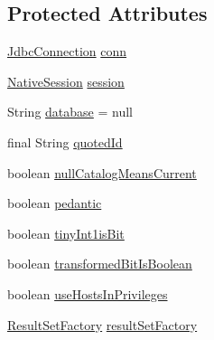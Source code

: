 \subsection*{Protected Attributes}
\begin{DoxyCompactItemize}
\item 
\mbox{\hyperlink{interfacecom_1_1mysql_1_1cj_1_1jdbc_1_1_jdbc_connection}{Jdbc\+Connection}} \mbox{\hyperlink{classcom_1_1mysql_1_1cj_1_1jdbc_1_1_database_meta_data_a29fa803adee5657c2bc4ecc79237ee5d}{conn}}
\item 
\mbox{\hyperlink{classcom_1_1mysql_1_1cj_1_1_native_session}{Native\+Session}} \mbox{\hyperlink{classcom_1_1mysql_1_1cj_1_1jdbc_1_1_database_meta_data_a10c93331f3bb1edfe4951c37ecffad95}{session}}
\item 
String \mbox{\hyperlink{classcom_1_1mysql_1_1cj_1_1jdbc_1_1_database_meta_data_a789acbb5308c9c0df47576c2d3c608f3}{database}} = null
\item 
final String \mbox{\hyperlink{classcom_1_1mysql_1_1cj_1_1jdbc_1_1_database_meta_data_abed2089ad23244c8fc1f4b4b2eb4b7d9}{quoted\+Id}}
\item 
boolean \mbox{\hyperlink{classcom_1_1mysql_1_1cj_1_1jdbc_1_1_database_meta_data_a4725e50078ee6414b6f2e78692e3109d}{null\+Catalog\+Means\+Current}}
\item 
boolean \mbox{\hyperlink{classcom_1_1mysql_1_1cj_1_1jdbc_1_1_database_meta_data_a959661937f63147361e0e2851ae843c9}{pedantic}}
\item 
boolean \mbox{\hyperlink{classcom_1_1mysql_1_1cj_1_1jdbc_1_1_database_meta_data_addab85a3ee910f7f60f7b5ac39d3c2cb}{tiny\+Int1is\+Bit}}
\item 
boolean \mbox{\hyperlink{classcom_1_1mysql_1_1cj_1_1jdbc_1_1_database_meta_data_afbbd197f41c44b67b3d11b2f3d9d6171}{transformed\+Bit\+Is\+Boolean}}
\item 
boolean \mbox{\hyperlink{classcom_1_1mysql_1_1cj_1_1jdbc_1_1_database_meta_data_a8d2477c23c641b8c301da4e258a585ad}{use\+Hosts\+In\+Privileges}}
\item 
\mbox{\hyperlink{classcom_1_1mysql_1_1cj_1_1jdbc_1_1result_1_1_result_set_factory}{Result\+Set\+Factory}} \mbox{\hyperlink{classcom_1_1mysql_1_1cj_1_1jdbc_1_1_database_meta_data_a339d870086c3e13ea14e9a6b3cf1894e}{result\+Set\+Factory}}
\end{DoxyCompactItemize}
